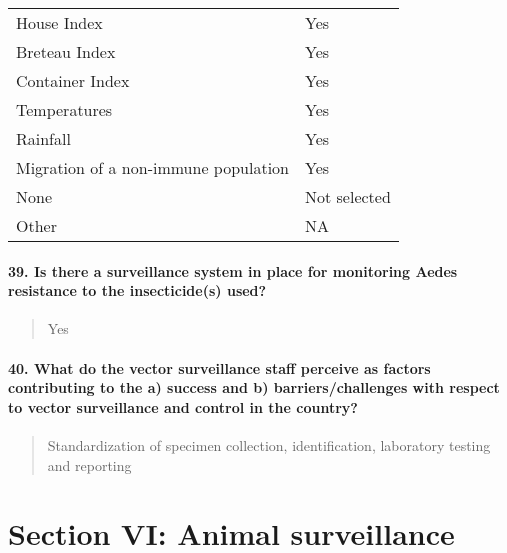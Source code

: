 \documentclass[
]{article}
\begin{document}
\begin{longtable}[]{@{}ll@{}}
\toprule
\endhead
House Index & Yes \\
Breteau Index & Yes \\
Container Index & Yes \\
Temperatures & Yes \\
Rainfall & Yes \\
Migration of a non-immune population & Yes \\
None & Not selected \\
Other & NA \\
\bottomrule
\end{longtable}

\hypertarget{is-there-a-surveillance-system-in-place-for-monitoring-aedes-resistance-to-the-insecticides-used}{%
\paragraph{39. Is there a surveillance system in place for monitoring
Aedes resistance to the insecticide(s)
used?}\label{is-there-a-surveillance-system-in-place-for-monitoring-aedes-resistance-to-the-insecticides-used}}

\begin{quote}
Yes
\end{quote}

\hypertarget{what-do-the-vector-surveillance-staff-perceive-as-factors-contributing-to-the-a-success-and-b-barrierschallenges-with-respect-to-vector-surveillance-and-control-in-the-country}{%
\paragraph{40. What do the vector surveillance staff perceive as factors
contributing to the a) success and b) barriers/challenges with respect
to vector surveillance and control in the
country?}\label{what-do-the-vector-surveillance-staff-perceive-as-factors-contributing-to-the-a-success-and-b-barrierschallenges-with-respect-to-vector-surveillance-and-control-in-the-country}}

\begin{quote}
Standardization of specimen collection, identification, laboratory
testing and reporting
\end{quote}

\hypertarget{section-vi-animal-surveillance}{%
\section{Section VI: Animal
surveillance}\label{section-vi-animal-surveillance}}
\end{document}

